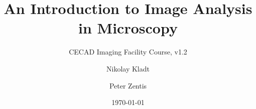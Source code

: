 \documentclass[12pt,twoside, parskip=half, headsepline=on, chapterprefix=true, draft=off]{scrbook}
\begin{document}
\title{An Introduction to Image Analysis in Microscopy}
\subtitle{CECAD Imaging Facility Course, v1.2} 
\author{Nikolay Kladt \and Peter Zentis}
\date{\today}
\publishers{Imaging Facility\\Cluster of Excellence -- Cellular Stress Responses in Aging-Associated Diseases\\University of Cologne}

\maketitle



\tableofcontents









\end{document}
